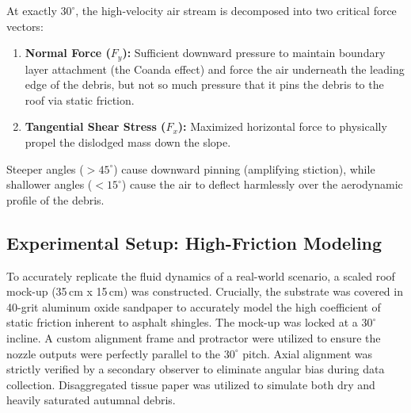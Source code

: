 \documentclass{article}
\begin{document}
At exactly $30^\circ$, the high-velocity air stream is decomposed into two critical force vectors:
\begin{enumerate}
    \item \textbf{Normal Force ($F_y$):} Sufficient downward pressure to maintain boundary layer attachment (the Coanda effect) and force the air underneath the leading edge of the debris, but not so much pressure that it pins the debris to the roof via static friction.
    \item \textbf{Tangential Shear Stress ($F_x$):} Maximized horizontal force to physically propel the dislodged mass down the slope.
\end{enumerate}
Steeper angles ($>45^\circ$) cause downward pinning (amplifying stiction), while shallower angles ($<15^\circ$) cause the air to deflect harmlessly over the aerodynamic profile of the debris.

\subsection{Experimental Setup: High-Friction Modeling}
To accurately replicate the fluid dynamics of a real-world scenario, a scaled roof mock-up (35\,cm x 15\,cm) was constructed. Crucially, the substrate was covered in 40-grit aluminum oxide sandpaper to accurately model the high coefficient of static friction inherent to asphalt shingles. The mock-up was locked at a $30^\circ$ incline. A custom alignment frame and protractor were utilized to ensure the nozzle outputs were perfectly parallel to the $30^\circ$ pitch. Axial alignment was strictly verified by a secondary observer to eliminate angular bias during data collection. Disaggregated tissue paper was utilized to simulate both dry and heavily saturated autumnal debris.
\end{document}
